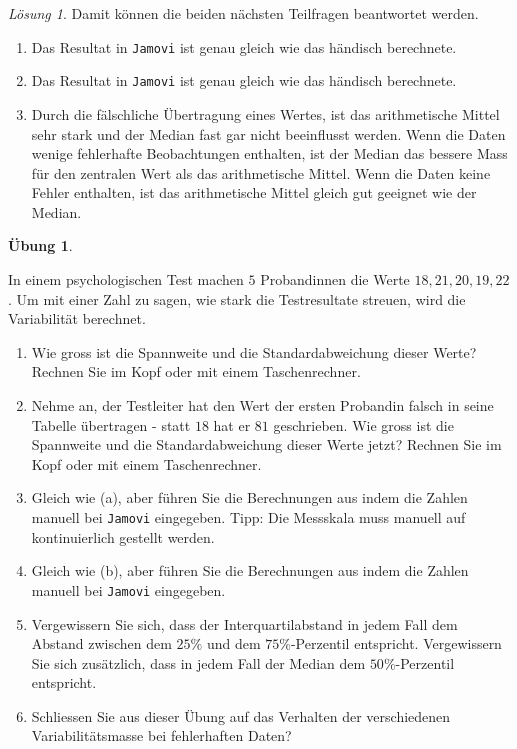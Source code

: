 \documentclass[
]{book}
\providecommand{\tightlist}{%
  \setlength{\itemsep}{0pt}\setlength{\parskip}{0pt}}
\theoremstyle{definition}
\theoremstyle{definition}
\theoremstyle{definition}
\newtheorem{exercise}{Übung}[chapter]
\theoremstyle{definition}
\theoremstyle{remark}
\newtheorem*{solution}{Lösung}
\begin{document}
\begin{solution}
Damit können die beiden nächsten Teilfragen beantwortet werden.

\begin{enumerate}
\def\labelenumi{(\alph{enumi})}
\setcounter{enumi}{2}
\tightlist
\item
  Das Resultat in \texttt{Jamovi} ist genau gleich wie das händisch berechnete.
\item
  Das Resultat in \texttt{Jamovi} ist genau gleich wie das händisch berechnete.
\item
  Durch die fälschliche Übertragung eines Wertes, ist das arithmetische Mittel sehr stark und der Median fast gar nicht beeinflusst werden. Wenn die Daten wenige fehlerhafte Beobachtungen enthalten, ist der Median das bessere Mass für den zentralen Wert als das arithmetische Mittel. Wenn die Daten keine Fehler enthalten, ist das arithmetische Mittel gleich gut geeignet wie der Median.
\end{enumerate}

\end{solution}

\begin{exercise}
\protect\hypertarget{exr:theorie-variabilitaet}{}\label{exr:theorie-variabilitaet}\leavevmode

In einem psychologischen Test machen \(5\) Probandinnen die Werte \(18, 21, 20, 19, 22\). Um mit einer Zahl zu sagen, wie stark die Testresultate streuen, wird die Variabilität berechnet.

\begin{enumerate}
\def\labelenumi{(\alph{enumi})}
\tightlist
\item
  Wie gross ist die Spannweite und die Standardabweichung dieser Werte? Rechnen Sie im Kopf oder mit einem Taschenrechner.
\item
  Nehme an, der Testleiter hat den Wert der ersten Probandin falsch in seine Tabelle übertragen - statt \(18\) hat er \(81\) geschrieben. Wie gross ist die Spannweite und die Standardabweichung dieser Werte jetzt? Rechnen Sie im Kopf oder mit einem Taschenrechner.
\item
  Gleich wie (a), aber führen Sie die Berechnungen aus indem die Zahlen manuell bei \texttt{Jamovi} eingegeben. Tipp: Die Messskala muss manuell auf kontinuierlich gestellt werden.
\item
  Gleich wie (b), aber führen Sie die Berechnungen aus indem die Zahlen manuell bei \texttt{Jamovi} eingegeben.
\item
  Vergewissern Sie sich, dass der Interquartilabstand in jedem Fall dem Abstand zwischen dem \(25\%\) und dem \(75\%\)-Perzentil entspricht. Vergewissern Sie sich zusätzlich, dass in jedem Fall der Median dem \(50\%\)-Perzentil entspricht.
\item
  Schliessen Sie aus dieser Übung auf das Verhalten der verschiedenen Variabilitätsmasse bei fehlerhaften Daten?
\end{enumerate}

\end{exercise}
\end{document}
